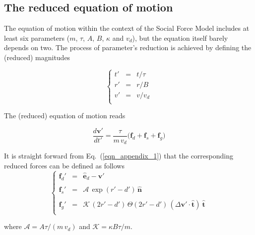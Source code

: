 \documentclass[preprint,12pt]{elsarticle}
\begin{document}
\subsection{\label{appendix_1}The reduced equation of motion}

The equation of motion within the context of the Social 
Force Model includes at least six parameters ($m$, $\tau$, $A$, $B$, 
$\kappa$ and $v_d$), but the equation itself barely depends on two. The process 
of parameter's reduction is achieved by defining the (reduced) magnitudes 

\begin{equation}
 \left\{\begin{array}{lll}
         t' & = & t/\tau \\
         r' & =& r/B \\
         v' & = & v/v_d \\
        \end{array}\right.
\end{equation}

The (reduced) equation of motion reads 


\begin{equation}
\displaystyle\frac{d\mathbf{v}'}{dt'}=
\displaystyle\frac{\tau}{m\,v_d}\bigg(\mathbf{f}_d+
\mathbf{f}_s+\mathbf{f}_g\bigg)\label{eqn_appendix_1}
\end{equation}

It is straight forward from Eq.~(\ref{eqn_appendix_1}) that the 
corresponding reduced forces can 
be defined as follows\\

\begin{equation}
 \left\{\begin{array}{lll}
         \mathbf{f}_d' & = & \hat{\mathbf{e}}_d-\mathbf{v}' \\
         && \\
         \mathbf{f}_s' & =& \mathcal{A}\,\exp(r'-d')\,\hat{\mathbf{n}} \\
         && \\
         \mathbf{f}_g' & = & 
\mathcal{K}\,(2r'-d')\,\Theta(2r'-d')\,(\Delta\mathbf{v}'\cdot\hat{\mathbf{t}})\
 
\hat{\mathbf{t}} \\
        \end{array}\right.\label{eqn_appendix_2}
\end{equation}


\noindent where $\mathcal{A}=A\tau/(m\,v_d)$ and 
$\mathcal{K}=\kappa B\tau/m$. \\ 
\end{document}
